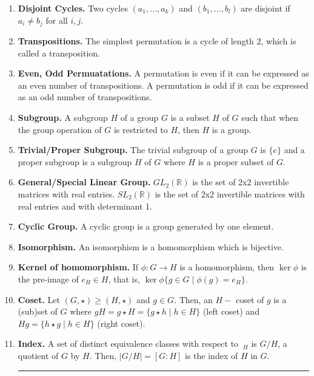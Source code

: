 \documentclass[12pt]{article}
\theoremstyle{definition}
\theoremstyle{named}
\begin{document}
\begin{enumerate}
	\item \textbf{Disjoint Cycles. } Two cycles $(a_1,\dots,a_k)$ and $(b_1,\dots,b_l)$ are disjoint if $a_i \neq b_j$ for all $i,j$. 
	\item \textbf{Transpositions. } The simplest permutation is a cycle of length 2, which is called a transposition. 
	\item \textbf{Even, Odd Permuatations. } A permutation is even if it can be expressed as an even number of transpositions. A permutation is odd if it can be expressed as an odd number of transpositions. 
	\item \textbf{Subgroup. } A subgroup $H$ of a group $G$ is a subset $H$ of $G$ such that when the group operation of $G$ is restricted to $H$, then $H$ is a group. 
	\item \textbf{Trivial/Proper Subgroup. } The trivial subgroup of a group $G$ is $\{e\}$ and a proper subgroup is a subgroup $H$ of $G$ where $H$ is a proper subset of $G$. 
	\item \textbf{General/Special Linear Group. } $GL_2(\mathbb{R})$ is the set of 2x2 invertible matrices with real entries. $SL_2(\mathbb{R})$ is the set of 2x2 invertible matrices with real entries and with determinant 1.
	\item \textbf{Cyclic Group. } A cyclic group is a group generated by one element. 
	\item \textbf{Isomorphism. } An isomorphism is a homomorphism which is bijective. 
	\item \textbf{Kernel of homomorphism. } If $\phi: G \to H$ is a homomorphism, then $\ker \phi$ is the pre-image of $e_H \in H$, that is, $\ker \phi \{g \in G \mid \phi(g)=e_H\}$.
	\item \textbf{Coset. } Let $(G,\star) \geq (H,\star)$ and $g \in G$. Then, an $H-$ coset of $g$ is a (sub)set of $G$ where $gH = g \star H = \{g \star h \mid h \in H\}$ (left coset) and $Hg = \{h \star g \mid h \in H\}$ (right coset). 
	\item \textbf{Index. } A set of distinct equivalence classes with respect to $~_H$ is $G/H$, a quotient of $G$ by $H$. Then, $|G/H| = [G:H]$ is the index of $H$ in $G$.  
	\begin{center}
		\hrule
	\end{center}
\end{enumerate}
\end{document}
